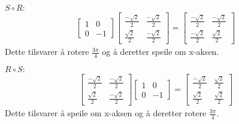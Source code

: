 \documentclass[11pt, a4paper, norsk]{NTNUoving}
\begin{document}
\begin{oppgave}[3]
$S \circ R:$
    \begin{align*}
    \begin{bmatrix} 1&0\\0&-1\end{bmatrix}\begin{bmatrix} \frac{-\sqrt{2}}{2}&\frac{-\sqrt{2}}{2}\\\frac{\sqrt{2}}{2}&\frac{-\sqrt{2}}{2}\end{bmatrix}=\begin{bmatrix} \frac{-\sqrt{2}}{2}&\frac{-\sqrt{2}}{2}\\\frac{-\sqrt{2}}{2}&\frac{\sqrt{2}}{2}\end{bmatrix}
    \end{align*}
    Dette tilsvarer å rotere $\frac{3\pi}{4}$ og å deretter speile om x-aksen.
    
$R \circ S:$
    \begin{align*}
    \begin{bmatrix} \frac{-\sqrt{2}}{2}&\frac{-\sqrt{2}}{2}\\\frac{\sqrt{2}}{2}&\frac{-\sqrt{2}}{2}\end{bmatrix}\begin{bmatrix} 1&0\\0&-1\end{bmatrix}=\begin{bmatrix} \frac{-\sqrt{2}}{2}&\frac{\sqrt{2}}{2}\\\frac{\sqrt{2}}{2}&\frac{\sqrt{2}}{2}\end{bmatrix}
    \end{align*}
    Dette tilsvarer å speile om x-aksen og å deretter rotere $\frac{3\pi}{4}$.
\end{oppgave}
\end{document}
